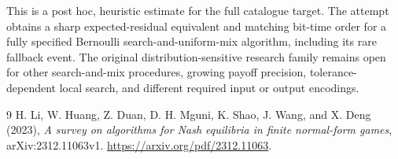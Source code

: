 \documentclass[11pt]{article}
\theoremstyle{definition}
\begin{document}
This is a post hoc, heuristic estimate for the full catalogue target.
The attempt obtains a sharp expected-residual equivalent and matching bit-time order for a fully specified Bernoulli search-and-uniform-mix algorithm, including its rare fallback event. The original distribution-sensitive research family remains open for other search-and-mix procedures, growing payoff precision, tolerance-dependent local search, and different required input or output encodings.

\begin{thebibliography}{9}
 H. Li, W. Huang, Z. Duan, D. H. Mguni, K. Shao,
J. Wang, and X. Deng (2023), \emph{A survey on algorithms for Nash
equilibria in finite normal-form games}, arXiv:2312.11063v1.
\url{https://arxiv.org/pdf/2312.11063}.
\end{thebibliography}
\end{document}
